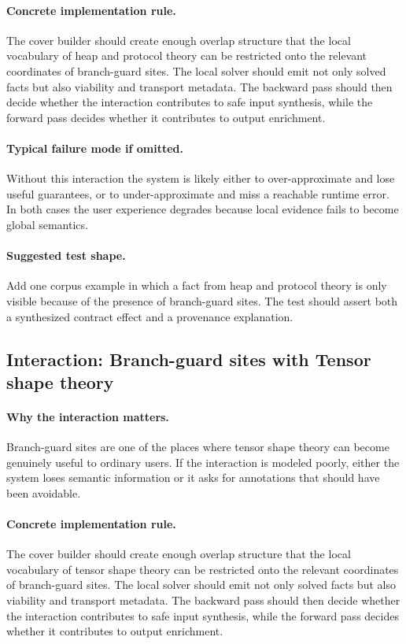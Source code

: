 \documentclass[11pt]{report}
\theoremstyle{definition}
\theoremstyle{plain}
\begin{document}
\paragraph{Concrete implementation rule.}
The cover builder should create enough overlap structure that the local
vocabulary of heap and protocol theory can be restricted onto the relevant
coordinates of branch-guard sites. The local solver should emit not only
solved facts but also viability and transport metadata. The backward pass
should then decide whether the interaction contributes to safe input
synthesis, while the forward pass decides whether it contributes to output
enrichment.

\paragraph{Typical failure mode if omitted.}
Without this interaction the system is likely either to over-approximate and
lose useful guarantees, or to under-approximate and miss a reachable runtime
error. In both cases the user experience degrades because local evidence
fails to become global semantics.

\paragraph{Suggested test shape.}
Add one corpus example in which a fact from heap and protocol theory is only
visible because of the presence of branch-guard sites. The test should
assert both a synthesized contract effect and a provenance explanation.

\subsection{Interaction: Branch-guard sites with Tensor shape theory}

\paragraph{Why the interaction matters.}
Branch-guard sites are one of the places where tensor shape theory can become
genuinely useful to ordinary users. If the interaction is modeled poorly,
either the system loses semantic information or it asks for annotations that
should have been avoidable.

\paragraph{Concrete implementation rule.}
The cover builder should create enough overlap structure that the local
vocabulary of tensor shape theory can be restricted onto the relevant
coordinates of branch-guard sites. The local solver should emit not only
solved facts but also viability and transport metadata. The backward pass
should then decide whether the interaction contributes to safe input
synthesis, while the forward pass decides whether it contributes to output
enrichment.
\end{document}
